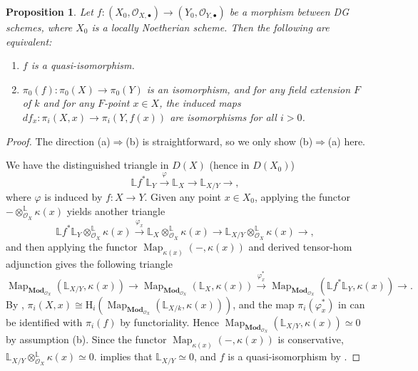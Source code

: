 \documentclass{article}
\numberwithin{equation}{section} %
\theoremstyle{plain}
\newtheorem{proposition}[theorem]{Proposition}
\theoremstyle{definition}
\theoremstyle{remark}
\begin{document}
\begin{proposition}\label{Prop__DerSchComparison}
Let $f:(X_0,\mathcal{O}_{X,\bullet})\to(Y_0,\mathcal{O}_{Y,\bullet})$ be a morphism between DG schemes, where $X_0$ is a locally Noetherian scheme.
Then the following are equivalent:
\begin{enumerate}[label=(\alph*)]
\item $f$ is a quasi-isomorphism.
\item $\pi_0(f):\pi_0(X)\to\pi_0(Y)$ is an isomorphism, and for any field extension $F$ of $k$ and for any $F$-point $x\in X$, the induced maps $df_x:\pi_i(X,x)\to\pi_i(Y,f(x))$ are isomorphisms for all $i>0$.
\end{enumerate}
\end{proposition}
\begin{proof}
The direction (a)$\Longrightarrow$(b) is straightforward, so we only show (b)$\Longrightarrow$(a) here.

We have the distinguished triangle in $D(X)$ (hence in $D(X_0)$)
\begin{equation*}
\mathbb{L}f^*\mathbb{L}_{Y}\xrightarrow{\varphi}\mathbb{L}_{X}\to\mathbb{L}_{X/Y}\to,
\end{equation*}
where $\varphi$ is induced by $f:X\to Y$.
Given any point $x\in X_0$, applying the functor $-\otimes^\mathbb{L}_{\mathcal{O}_X}\kappa(x)$ yields another triangle
\begin{equation*}
\mathbb{L}f^*\mathbb{L}_{Y}\otimes^\mathbb{L}_{\mathcal{O}_X}\kappa(x)\xrightarrow{\varphi_x}\mathbb{L}_{X}\otimes^\mathbb{L}_{\mathcal{O}_X}\kappa(x)\to\mathbb{L}_{X/Y}\otimes^\mathbb{L}_{\mathcal{O}_X}\kappa(x)\to,
\end{equation*}
and then applying the functor $\operatorname{Map}_{\kappa(x)}(-,\kappa(x))$ and derived tensor-hom adjunction gives the following triangle
\begin{equation}\label{Eq_ComparisonTriangle}
\operatorname{Map}_{\mathbf{Mod}_{\mathcal{O}_{X}}}(\mathbb{L}_{X/Y},\kappa(x))\to\operatorname{Map}_{\mathbf{Mod}_{\mathcal{O}_{X}}}(\mathbb{L}_{X},\kappa(x))\xrightarrow{\varphi_x^*}\operatorname{Map}_{\mathbf{Mod}_{\mathcal{O}_{X}}}(\mathbb{L}f^*\mathbb{L}_{Y},\kappa(x))\to.
\end{equation}
By , $\pi_i(X,x)\cong\mathrm{H}_i(\operatorname{Map}_{\mathbf{Mod}_{\mathcal{O}_{X}}}(\mathbb{L}_{X/k},\kappa(x)))$, and the map $\pi_i(\varphi_x^*)$ in  can be identified with $\pi_i(f)$ by functoriality.
Hence $\operatorname{Map}_{\mathbf{Mod}_{\mathcal{O}_{X}}}(\mathbb{L}_{X/Y},\kappa(x))\simeq0$ by assumption (b).
Since the functor $\operatorname{Map}_{\kappa(x)}(-,\kappa(x))$ is conservative, $\mathbb{L}_{X/Y}\otimes^\mathbb{L}_{\mathcal{O}_X}\kappa(x)\simeq0$.
 implies that $\mathbb{L}_{X/Y}\simeq0$, and $f$ is a quasi-isomorphism by .
\end{proof}
\end{document}
